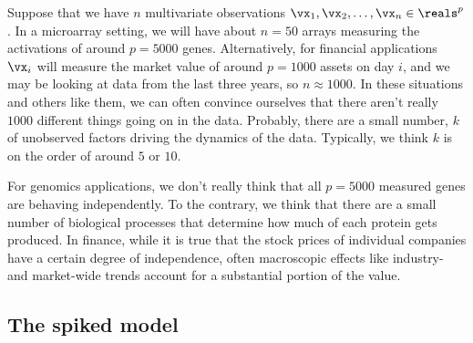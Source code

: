 Suppose that we have $n$ multivariate observations $\vx_{1}, \vx_{2}, \ldots,
\vx_{n} \in \reals^p$. In a microarray setting, we will have about $n=50$
arrays measuring the activations of around $p=5000$ genes. Alternatively, for
financial applications $\vx_i$ will measure the market value of around
$p=1000$ assets on day $i$, and we may be looking at data from the last three
years, so $n \approx 1000$. In these situations and others like them, we can
often convince ourselves that there aren't really $1000$ different things
going on in the data. Probably, there are a small number, $k$ of unobserved
factors driving the dynamics of the data. Typically, we think $k$ is on the
order of around $5$ or $10$.

For genomics applications, we don't really think that all $p=5000$ measured
genes are behaving independently. To the contrary, we think that there are a
small number of biological processes that determine how much of each protein
gets produced. In finance, while it is true that the stock prices of
individual companies have a certain degree of independence, often macroscopic
effects like industry- and market-wide trends account for a substantial
portion of the value.

\subsection{The spiked model}

